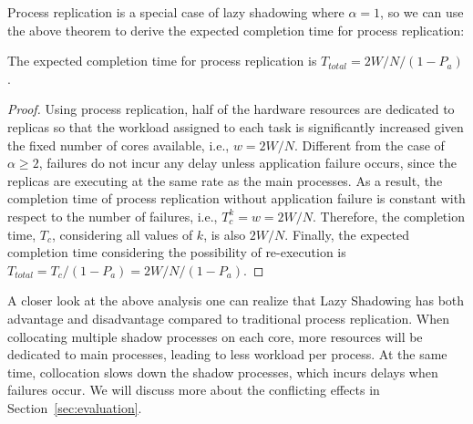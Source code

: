 Process replication is a special case of lazy shadowing where $\alpha=1$, so we can use the above theorem to derive the expected completion time for process replication:

\begin{corollary}
The expected completion time for process replication is $T_{total} = 2W/N / (1 - P_a)$.
\end{corollary}
\begin{proof}
Using process replication, half of the hardware resources are dedicated to replicas so that the workload assigned to each task is significantly increased given the fixed number of cores available, i.e., $w=2W/N$. Different from the case of $\alpha \ge 2$, failures do not incur any delay unless application failure occurs, since the replicas are executing at the same rate as the main processes. As a result, the completion time of process replication without application failure is constant with respect to the number of failures, i.e., $T_c^k=w=2W/N$. Therefore, the completion time, $T_c$, considering all values of $k$, is also $2W/N$. Finally, the expected completion time considering the possibility of re-execution is $T_{total} = T_c / (1 - P_a) = 2W/N / (1 - P_a)$.
\end{proof}

A closer look at the above analysis one can realize that Lazy Shadowing has both advantage and disadvantage compared to traditional process replication. When collocating multiple shadow processes on each core, more resources will be dedicated to main processes, leading to less workload per process. At the same time, collocation slows down the shadow processes, which incurs delays when failures occur. We will discuss more about the conflicting effects in Section~\ref{sec:evaluation}.







